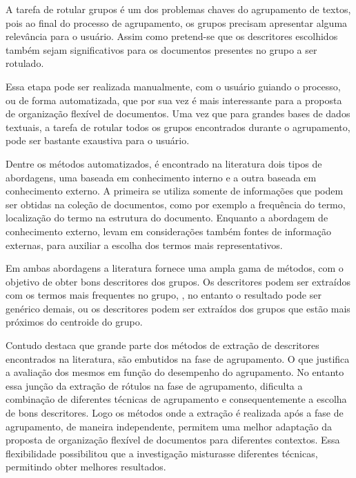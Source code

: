 A tarefa de rotular grupos é um dos problemas chaves do agrupamento de textos, 
pois ao final do processo de agrupamento, os grupos precisam apresentar alguma relevância para 
o usuário\cite{Zhang2008}. Assim como pretend-se que os descritores escolhidos também sejam 
significativos para os documentos presentes no grupo a ser rotulado. 

Essa etapa pode ser realizada manualmente, com o usuário guiando o processo, ou de forma 
automatizada, que por sua vez é mais interessante para a proposta de organização flexível de 
documentos. Uma vez que para grandes bases de dados textuais, a tarefa de rotular todos os grupos
encontrados durante o agrupamento, pode ser bastante exaustiva para o usuário.

Dentre os métodos automatizados, é encontrado na literatura dois tipos de abordagens, uma 
baseada em conhecimento interno e a outra baseada em conhecimento externo\cite{Nogueira2013}. 
A primeira se utiliza somente de informações que podem ser obtidas na coleção de documentos, 
como por exemplo a frequência do termo, localização do termo na estrutura do documento.
Enquanto a abordagem de conhecimento externo, levam em considerações também fontes de informação
externas, para auxiliar a escolha dos termos mais representativos. 

Em ambas abordagens a literatura fornece uma ampla gama de métodos, com o objetivo de obter bons
descritores dos grupos. Os descritores podem ser extraídos com os termos mais frequentes no grupo,
, no entanto o resultado pode ser genérico demais\cite{Pucktada2006}, ou os descritores podem
ser extraídos dos grupos que estão mais próximos do centroide do grupo.

Contudo \cite{Nogueira2013} destaca que grande parte dos métodos de extração de descritores 
encontrados na literatura, são embutidos na fase de agrupamento. O que justifica a avaliação 
dos mesmos em função do desempenho do agrupamento. No entanto essa junção da extração de rótulos
na fase de agrupamento, dificulta a combinação de diferentes técnicas de agrupamento e 
consequentemente a escolha de bons descritores. Logo os métodos onde a extração é realizada 
após a fase de agrupamento,
de maneira independente, permitem uma melhor adaptação da proposta de organização flexível de 
documentos para diferentes contextos. Essa flexibilidade possibilitou que a investigação
misturasse diferentes técnicas, permitindo obter melhores resultados.






